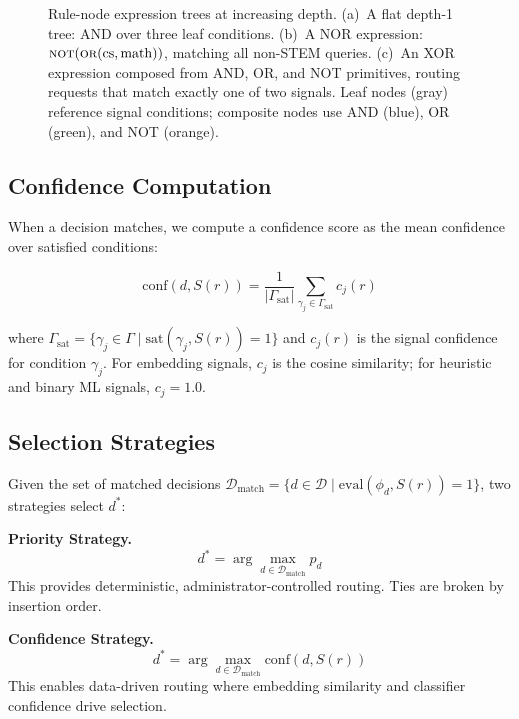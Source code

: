 \begin{figure}[ht]
{\begin{tikzpicture}
  \end{tikzpicture}%
}
  \caption{Rule-node expression trees at increasing depth. (a)~A flat depth-1 tree: AND over three leaf conditions. (b)~A NOR expression: $\textsc{not}(\textsc{or}(\text{cs},\text{math}))$, matching all non-STEM queries. (c)~An XOR expression composed from AND, OR, and NOT primitives, routing requests that match exactly one of two signals. Leaf nodes (gray) reference signal conditions; composite nodes use AND (\textcolor{blue!50}{blue}), OR (\textcolor{green!50}{green}), and NOT (\textcolor{orange!45}{orange}).}
  \label{fig:rule_node_tree}
\end{figure}

\subsection{Confidence Computation}

When a decision matches, we compute a confidence score as the mean confidence over satisfied conditions:

\begin{equation}
  \text{conf}(d, S(r)) = \frac{1}{|\Gamma_\text{sat}|} \sum_{\gamma_j \in \Gamma_\text{sat}} c_j(r)
  \label{eq:confidence}
\end{equation}

where $\Gamma_\text{sat} = \{\gamma_j \in \Gamma \mid \text{sat}(\gamma_j, S(r)) = 1\}$ and $c_j(r)$ is the signal confidence for condition $\gamma_j$.
For embedding signals, $c_j$ is the cosine similarity; for heuristic and binary ML signals, $c_j = 1.0$.

\subsection{Selection Strategies}

Given the set of matched decisions $\mathcal{D}_\text{match} = \{d \in \mathcal{D} \mid \text{eval}(\phi_d, S(r)) = 1\}$, two strategies select $d^*$:

\noindent\textbf{Priority Strategy.}
\begin{equation}
  d^* = \arg\max_{d \in \mathcal{D}_\text{match}} p_d
\end{equation}
This provides deterministic, administrator-controlled routing.
Ties are broken by insertion order.

\noindent\textbf{Confidence Strategy.}
\begin{equation}
  d^* = \arg\max_{d \in \mathcal{D}_\text{match}} \text{conf}(d, S(r))
\end{equation}
This enables data-driven routing where embedding similarity and classifier confidence drive selection.

